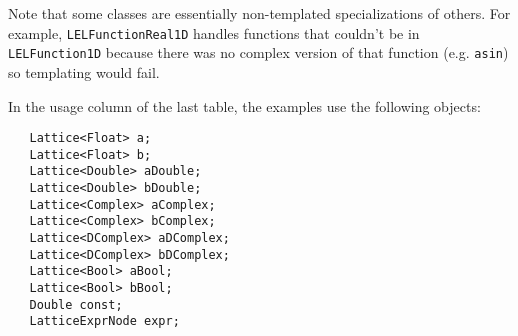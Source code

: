 Note that some classes are essentially non-templated specializations of
others.  For example, {\tt LELFunctionReal1D} handles functions that
couldn't be in {\tt LELFunction1D} because there was no complex version
of that function (e.g.  {\tt asin}) so templating would fail. 

  
In the usage column of the last table, the examples use
the following objects:

\begin{verbatim}
   Lattice<Float> a;
   Lattice<Float> b;
   Lattice<Double> aDouble;
   Lattice<Double> bDouble;
   Lattice<Complex> aComplex;
   Lattice<Complex> bComplex;
   Lattice<DComplex> aDComplex;
   Lattice<DComplex> bDComplex;
   Lattice<Bool> aBool;
   Lattice<Bool> bBool;
   Double const;
   LatticeExprNode expr; 
\end{verbatim}


